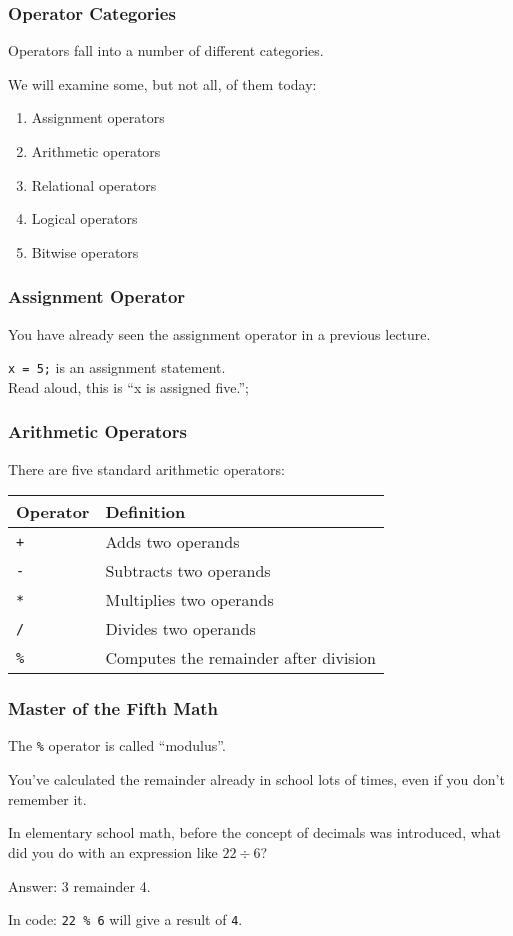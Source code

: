 \begin{frame}
\frametitle{Operator Categories}
Operators fall into a number of different categories. 

We will examine some, but not all, of them today:
\begin{enumerate}
	\item Assignment operators
	\item Arithmetic operators
	\item Relational operators
	\item Logical operators
	\item Bitwise operators
\end{enumerate}

\end{frame}

\begin{frame}
\frametitle{Assignment Operator}
You have already seen the assignment operator in a previous lecture.

\texttt{x = 5;} is an assignment statement.\\
Read aloud, this is ``x is assigned five.'';

\end{frame}

\begin{frame}
\frametitle{Arithmetic Operators}
There are five standard arithmetic operators:

\begin{center}
\begin{tabular}{l|l}
	\textbf{Operator} & \textbf{Definition} \\ \hline
	\texttt{+} & Adds two operands\\ \hline
	\texttt{-} & Subtracts two operands\\ \hline
	\texttt{*} & Multiplies two operands\\ \hline
	\texttt{/} & Divides two operands\\ \hline
	\texttt{\%} & Computes the remainder after division\\
\end{tabular}
\end{center}

\end{frame}

\begin{frame}
\frametitle{Master of the Fifth Math}

The \texttt{\%} operator is called ``modulus''. 

You've calculated the remainder already in school lots of times, even if you don't remember it.

In elementary school math, before the concept of decimals was introduced, what did you do with an expression like $22 \div 6$?

Answer: 3 remainder 4.

In code: \texttt{22 \% 6} will give a result of \texttt{4}.

\end{frame}

